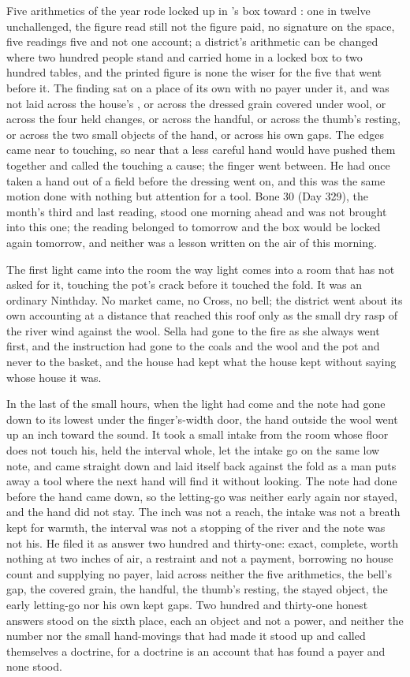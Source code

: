 Five arithmetics of the year rode locked up  in 's box toward : one in twelve unchallenged, the figure read still not the figure paid, no signature on the space, five readings five and not one account; a district's arithmetic can be changed where two hundred people stand and carried home in a locked box to two hundred tables, and the printed figure is none the wiser for the five that went before it. The finding sat on a place of its own with no payer under it, and was not laid across the house's , or across the dressed grain covered under wool, or across the four held changes, or across the handful, or across the thumb's resting, or across the two small objects of the hand, or across his own gaps. The edges came near to touching, so near that a less careful hand would have pushed them together and called the touching a cause; the finger went between. He had once taken a hand out of a field before the dressing went on, and this was the same motion done with nothing but attention for a tool. Bone 30 (Day 329), the month's third and last reading, stood one morning ahead and was not brought into this one; the reading belonged to tomorrow and the box would be locked again tomorrow, and neither was a lesson written on the air of this morning.

The first light came into the room the way light comes into a room that has not asked for it, touching the pot's crack before it touched the fold. It was an ordinary Ninthday. No market came, no Cross, no bell; the district went about its own accounting at a distance that reached this roof only as the small dry rasp of the river wind against the wool. Sella had gone to the fire as she always went first, and the instruction had gone to the coals and the wool and the pot and never to the basket, and the house had kept what the house kept without saying whose house it was.

In the last of the small hours, when the light had come and the note had gone down to its lowest under the finger's-width door, the hand outside the wool went up an inch toward the sound. It took a small intake from the room whose floor does not touch his, held the interval whole, let the intake go on the same low note, and came straight down and laid itself back against the fold as a man puts away a tool where the next hand will find it without looking. The note had done before the hand came down, so the letting-go was neither early again nor stayed, and the hand did not stay. The inch was not a reach, the intake was not a breath kept for warmth, the interval was not a stopping of the river and the note was not his. He filed it as answer two hundred and thirty-one: exact, complete, worth nothing at two inches of air, a restraint and not a payment, borrowing no house count and supplying no payer, laid across neither the five arithmetics, the bell's gap, the covered grain, the handful, the thumb's resting, the stayed object, the early letting-go nor his own kept gaps. Two hundred and thirty-one honest answers stood on the sixth place, each an object and not a power, and neither the number nor the small hand-movings that had made it stood up and called themselves a doctrine, for a doctrine is an account that has found a payer and none stood.

